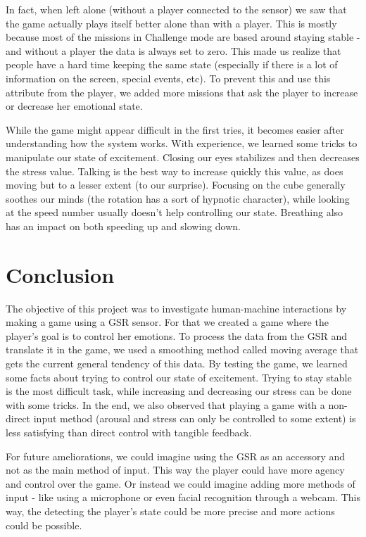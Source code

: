 \documentclass[12pt,a4paper]{article}
\begin{document}
In fact, when left alone (without a player connected to the sensor) we saw that the game actually plays itself better alone than with a player. This is mostly because most of the missions in Challenge mode are based around staying stable - and without a player the data is always set to zero. This made us realize that people have a hard time keeping the same state (especially if there is a lot of information on the screen, special events, etc). To prevent this and use this attribute from the player, we added more missions that ask the player to increase or decrease her emotional state.

While the game might appear difficult in the first tries, it becomes easier after understanding how the system works. With experience, we learned some tricks to manipulate our state of excitement. Closing our eyes stabilizes and then decreases the stress value. Talking is the best way to increase quickly this value, as does moving but to a lesser extent (to our surprise). Focusing on the cube generally soothes our minds (the rotation has a sort of hypnotic character), while looking at the speed number usually doesn't help controlling our state. Breathing also has an impact on both speeding up and slowing down. 

\section{Conclusion}

The objective of this project was to investigate human-machine interactions by making a game using a GSR sensor. For that we created a game where the player's goal is to control her emotions. To process the data from the GSR and translate it in the game, we used a smoothing method called moving average that gets the current general tendency of this data. By testing the game, we learned some facts about trying to control our state of excitement. Trying to stay stable is the most difficult task, while increasing and decreasing our stress can be done with some tricks. In the end, we also observed that playing a game with a non-direct input method (arousal and stress can only be controlled to some extent) is less satisfying than direct control with tangible feedback.

For future ameliorations, we could imagine using the GSR as an accessory and not as the main method of input. This way the player could have more agency and control over the game. Or instead we could imagine adding more methods of input - like using a microphone or even facial recognition through a webcam. This way, the detecting the player's state could be more precise and more actions could be possible.
\end{document}
